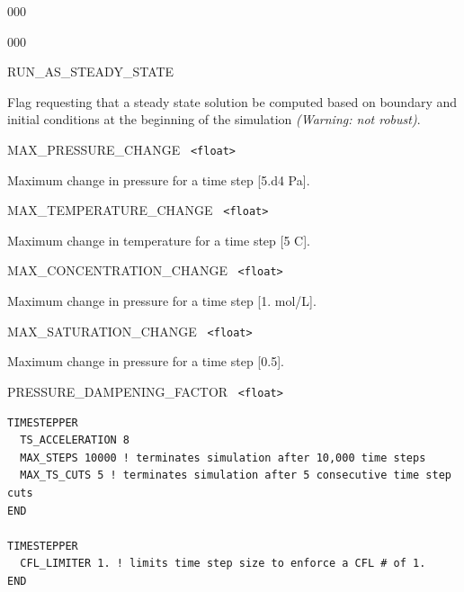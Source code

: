 \begin{deflist}{000}
\begin{deflist}{000}
\item[RUN\_AS\_STEADY\_STATE] ~

Flag requesting that a steady state solution be computed based on boundary and initial conditions at the beginning of the simulation {\em (Warning: not robust)}.

\item[MAX\_PRESSURE\_CHANGE] \ {\tt <float>} 

Maximum change in pressure for a time step [5.d4 Pa].

\item[MAX\_TEMPERATURE\_CHANGE] \ {\tt <float>} 

Maximum change in temperature for a time step [5 C].

\item[MAX\_CONCENTRATION\_CHANGE] \ {\tt <float>} 

Maximum change in pressure for a time step [1. mol/L].

\item[MAX\_SATURATION\_CHANGE] \ {\tt <float>} 

Maximum change in pressure for a time step [0.5].

\item[PRESSURE\_DAMPENING\_FACTOR] \ {\tt <float>}
\end{deflist}
\item[\keyend]
\end{deflist}


\newpage
{}

\begin{mdframed}
\footnotesize
\begin{Verbatim}
TIMESTEPPER
  TS_ACCELERATION 8
  MAX_STEPS 10000 ! terminates simulation after 10,000 time steps
  MAX_TS_CUTS 5 ! terminates simulation after 5 consecutive time step cuts
END

TIMESTEPPER
  CFL_LIMITER 1. ! limits time step size to enforce a CFL # of 1.
END
\end{Verbatim}
\normalsize
\end{mdframed}

\hyperlink{target_key}{\return}


